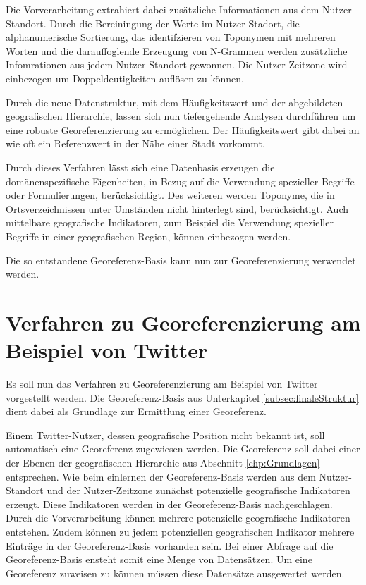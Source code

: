 			Die Vorverarbeitung extrahiert dabei zusätzliche Informationen aus dem Nutzer-Standort.
			Durch die Bereiningung der Werte im Nutzer-Stadort, die alphanumerische Sortierung, das identifzieren von Toponymen mit mehreren Worten und die darauffoglende Erzeugung von N-Grammen werden zusätzliche Infomrationen aus jedem Nutzer-Standort gewonnen.
			Die Nutzer-Zeitzone wird einbezogen um Doppeldeutigkeiten auflösen zu können.

			Durch die neue Datenstruktur, mit dem Häufigkeitswert und der abgebildeten geografischen Hierarchie, lassen sich nun tiefergehende Analysen durchführen um eine robuste Georeferenzierung zu ermöglichen. 
			Der Häufigkeitswert gibt dabei an wie oft ein Referenzwert in der Nähe einer Stadt vorkommt.

			Durch dieses Verfahren lässt sich eine Datenbasis erzeugen die domänenspezifische Eigenheiten, in Bezug auf die Verwendung spezieller Begriffe oder Formulierungen, berücksichtigt.
			Des weiteren werden Toponyme, die in Ortsverzeichnissen unter Umständen nicht hinterlegt sind, berücksichtigt.
			Auch mittelbare geografische Indikatoren, zum Beispiel die Verwendung spezieller Begriffe in einer geografischen Region, können einbezogen werden.

			Die so entstandene Georeferenz-Basis kann nun zur Georeferenzierung verwendet werden. 

	\section{Verfahren zu Georeferenzierung am Beispiel von Twitter}

		Es soll nun das Verfahren zu Georeferenzierung am Beispiel von Twitter vorgestellt werden.
		Die Georeferenz-Basis aus Unterkapitel \ref{subsec:finaleStruktur} dient dabei als Grundlage zur Ermittlung einer Georeferenz.

		Einem Twitter-Nutzer, dessen geografische Position nicht bekannt ist, soll automatisch eine Georeferenz zugewiesen werden.
		Die Georeferenz soll dabei einer der Ebenen der geografischen Hierarchie aus Abschnitt \ref{chp:Grundlagen} entsprechen. 
		Wie beim einlernen der Georeferenz-Basis werden aus dem Nutzer-Standort und der Nutzer-Zeitzone zunächst potenzielle geografische Indikatoren erzeugt.
		Diese Indikatoren werden in der Georeferenz-Basis nachgeschlagen.
		Durch die Vorverarbeitung können mehrere potenzielle geografische Indikatoren entstehen. 
		Zudem können zu jedem potenziellen geografischen Indikator mehrere Einträge in der Georeferenz-Basis vorhanden sein.
		Bei einer Abfrage auf die Georeferenz-Basis ensteht somit eine Menge von Datensätzen.
		Um eine Georeferenz zuweisen zu können müssen diese Datensätze ausgewertet werden.
		
